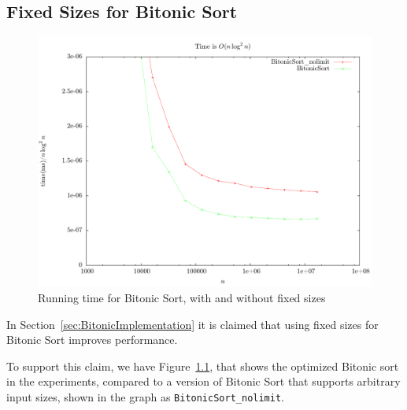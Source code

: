 \begin{appendices}
\chapter{Fixed Sizes for Bitonic Sort}
\label{app:BitonicSize}
\begin{figure}
\center
\includegraphics[width=\textwidth]{graphs/compiler/nlogntime.pdf}
\caption{Running time for Bitonic Sort, with and without fixed sizes}
\label{fig:BitonicSize}
\end{figure}
In Section~\ref{sec:BitonicImplementation} it is claimed that using fixed sizes for Bitonic Sort improves performance.

To support this claim, we have Figure~\ref{fig:BitonicSize}, that shows the optimized Bitonic sort in the experiments, compared to a version of Bitonic Sort that supports arbitrary input sizes, shown in the graph as \texttt{BitonicSort\_nolimit}.


\end{appendices}
